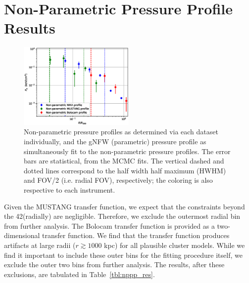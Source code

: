 \documentclass[twocolumn,traditabstract]{aa}
\begin{document}
\section{Non-Parametric Pressure Profile Results}
\label{sec:np_res}

\begin{figure}[!h]
  \centering
  \includegraphics[width=0.5\textwidth]{NIKA_ml_deproj_figs/Real_Joint_gNFW_Real_11011111_2500S_500B_100W_non_parametric_pressure_p16cosmo.eps}
  \caption{Non-parametric pressure profiles as determined via each dataset individually, and the gNFW (parametric)
    pressure profile as simultaneously fit to the non-parametric pressure profiles. The error bars are statistical,
    from the MCMC fits. The vertical dashed and dotted lines correspond to the half width half maximum (HWHM) and
    FOV/2 (i.e. radial FOV), respectively; the coloring is also respective to each instrument.}
  \label{fig:joint_pressure}
\end{figure}

Given the MUSTANG transfer function, we expect that the constraints beyond the 42\asecs (radially) are negligible. Therefore,
we exclude the outermost radial bin from further analysis.
The Bolocam transfer function is provided as a two-dimensional transfer function. We find that the transfer function produces
artifacts at large radii ($r \gtrsim 1000$ kpc) for all plausible cluster models. While we find it important to include these
outer bins for the fitting procedure itself, we exclude the outer two bins from further analysis. The results, after these
exclusions, are tabulated in Table~\ref{tbl:nppp_res}.


\end{document}
